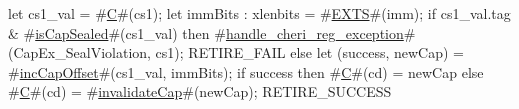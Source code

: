 let cs1_val = #\hyperref[sailRISCVzC]{C}#(cs1);
let immBits : xlenbits = #\hyperref[sailRISCVzEXTS]{EXTS}#(imm);
if cs1_val.tag & #\hyperref[sailRISCVzisCapSealed]{isCapSealed}#(cs1_val) then {
  #\hyperref[sailRISCVzhandlezycherizyregzyexception]{handle\_cheri\_reg\_exception}#(CapEx_SealViolation, cs1);
  RETIRE_FAIL
} else {
  let (success, newCap) = #\hyperref[sailRISCVzincCapOffset]{incCapOffset}#(cs1_val, immBits);
  if success then
    #\hyperref[sailRISCVzC]{C}#(cd) = newCap
  else
    #\hyperref[sailRISCVzC]{C}#(cd) = #\hyperref[sailRISCVzinvalidateCap]{invalidateCap}#(newCap);
  RETIRE_SUCCESS
}
